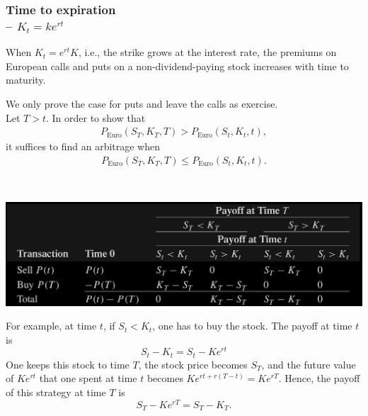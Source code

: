 \begin{frame}[fragile]
	\frametitle{Time to expiration \\  -- $K_t=k e^{rt}$}

	\begin{mythm}
		When $K_t=e^{rt} K$, i.e., the strike grows at the interest rate, the premiums on European calls
		and puts on a non-dividend-paying stock increases with time to maturity.
	\end{mythm}
	\bigskip
	\pause
	\begin{myproof} We only prove the case for puts and leave the calls as exercise. \\
		Let $T>t$. In order to show that
	  \begin{align*}
		 	 P_{\text{Euro}}(S_T, K_T, T) > P_{\text{Euro}}(S_t, K_t, t),
		\end{align*}
		it suffices to find an arbitrage when
	  \begin{align*}
		 	 P_{\text{Euro}}(S_T, K_T, T) \le P_{\text{Euro}}(S_t, K_t, t).
		\end{align*}
	\end{myproof}
\end{frame}
\begin{frame}[fragile,t]
	\begin{myproof}[ (continued)] \\
		\begin{center}
			\includegraphics[scale=0.2]{figs/Table-9-5.png}
		\end{center}
		\bigskip

		For example, at time $t$, if $S_t<K_t$, one has to buy the stock. The payoff at time $t$ is
		\begin{equation*}
			S_t - K_t = S_t - K e^{rt}
		\end{equation*}
		One keeps this stock to time $T$, the stock price becomes  $S_T$, and the future value of
		$Ke^{rt}$ that one spent at time $t$ becomes  $Ke^{rt + r(T-t)}=Ke^{rT}$. Hence, the payoff of
		this strategy at time $T$ is
		\begin{equation*}
			S_T - Ke^{rT} = S_T - K_T.
		\end{equation*}
		\myEnd
	\end{myproof}
\end{frame}

